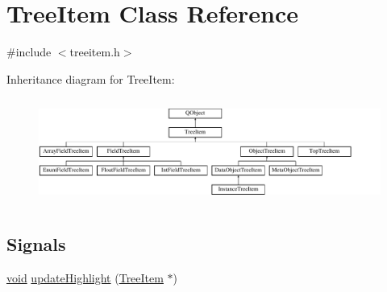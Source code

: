 \hypertarget{class_tree_item}{\section{Tree\-Item Class Reference}
\label{class_tree_item}
}


{\ttfamily \#include $<$treeitem.\-h$>$}

Inheritance diagram for Tree\-Item\-:\begin{figure}[H]
\begin{center}
\leavevmode
\includegraphics[height=3.508772cm]{class_tree_item}
\end{center}
\end{figure}
\subsection*{Signals}
\begin{DoxyCompactItemize}
\item 
\hyperlink{group___u_a_v_objects_plugin_ga444cf2ff3f0ecbe028adce838d373f5c}{void} \hyperlink{group___u_a_v_object_browser_plugin_gab8702d2046500fbe3dd7cee66ebcda70}{update\-Highlight} (\hyperlink{class_tree_item}{Tree\-Item} $\ast$)
\end{DoxyCompactItemize}

